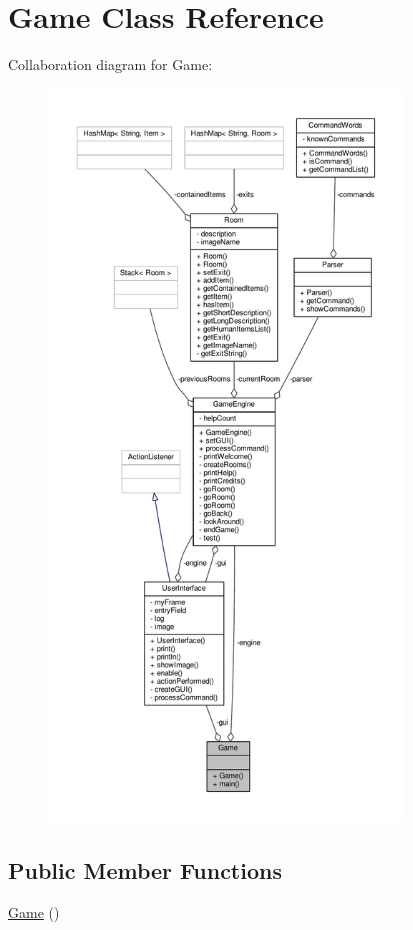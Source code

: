 \hypertarget{classGame}{\section{Game Class Reference}
\label{classGame}
}


Collaboration diagram for Game\-:
\nopagebreak
\begin{figure}[H]
\begin{center}
\leavevmode
\includegraphics[height=550pt]{classGame__coll__graph}
\end{center}
\end{figure}
\subsection*{Public Member Functions}
\begin{DoxyCompactItemize}
\item 
\hyperlink{classGame_a2e034e53e9c032964ecd2a831b29a616}{Game} ()
\end{DoxyCompactItemize}
